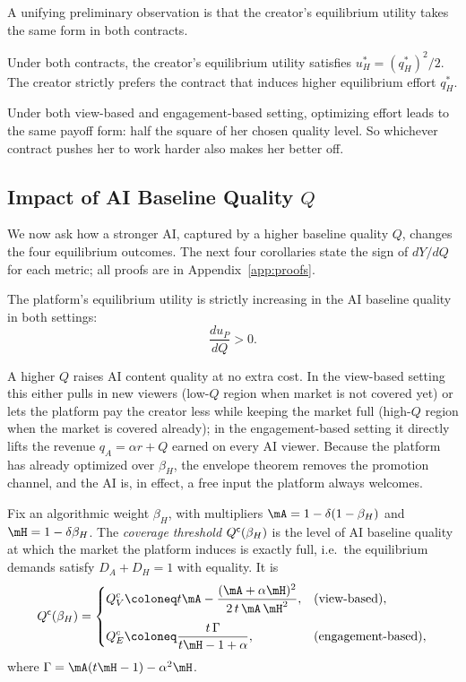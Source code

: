 A unifying preliminary observation is that the creator's equilibrium
utility takes the same form in both contracts.


\begin{corollary}\label{lem:uc}
Under both contracts, the creator's equilibrium utility satisfies $u_H^* = (q_H^*)^2/2$. The creator strictly prefers the contract that induces higher equilibrium effort $q_H^*$.
\end{corollary}
Under both view-based and engagement-based setting, optimizing effort leads to the same payoff form: half the square of her chosen quality level. So whichever contract pushes her to work harder also makes her better off.



\subsection{Impact of AI Baseline Quality $Q$}\label{subsec:comp-Q}

We now ask how a stronger AI, captured by a higher baseline quality
$Q$, changes the four equilibrium outcomes. 
The next four corollaries
state the sign of $dY/dQ$ for each metric; all proofs are in
Appendix~\ref{app:proofs}.
 
\begin{corollary}\label{cor:Q_up}
The platform's equilibrium utility is strictly increasing in the AI
baseline quality in both settings:
\[
\frac{d u_P}{dQ}>0.
\]
\end{corollary}
 
A higher $Q$ raises AI content quality at no extra cost. In the
view-based setting this either pulls in new viewers (low-$Q$ region when market is not covered yet) or lets
the platform pay the creator less while keeping the market full
(high-$Q$ region when the market is covered already); in the engagement-based setting it directly lifts the
revenue $q_A=\alpha r+Q$ earned on every AI viewer. Because the
platform has already optimized over $\beta_H$, the envelope theorem
removes the promotion channel, and the AI is, in effect, a free input
the platform always welcomes.

\begin{definition}\label{def:coverage}
Fix an algorithmic weight $\beta_H$, with multipliers $\mA=1-\delta(1-\beta_H)$ and
$\mH=1-\delta\beta_H$. The \emph{coverage threshold} $Q^{\sf c}(\beta_H)$ is the
level of AI baseline quality at which the market the platform induces is exactly
full, i.e.\ the equilibrium demands satisfy $D_A+D_H=1$ with equality. It is
\[
    Q^{\sf c}(\beta_H)=
    \begin{cases}
        \displaystyle Q_V^c\coloneq t\mA-\frac{(\mA+\alpha\mH)^{2}}{2\,t\,\mA\,\mH^{2}}, & \text{(view-based)},\\[12pt]
        \displaystyle Q_E^c \coloneq\frac{t\,\Gamma}{t\mH-1+\alpha}, & \text{(engagement-based)},
    \end{cases}
\]
where $\Gamma=\mA(t\mH-1)-\alpha^{2}\mH$.
\end{definition}

